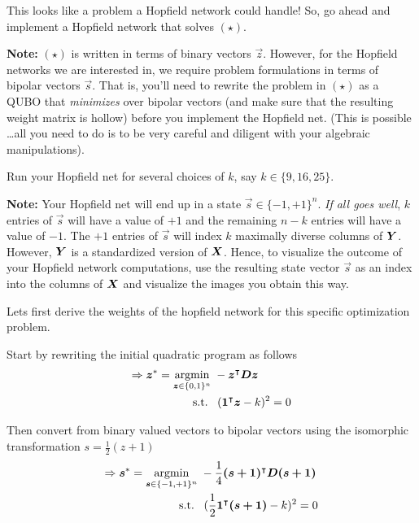 This looks like a problem a Hopfield network could handle! So, go ahead and implement a Hopfield network that solves $(\star)$.

\textbf{Note:} $(\star)$ is written in terms of binary vectors $\vec{z}$. However, for the Hopfield networks we are interested in, we require problem formulations in terms of bipolar vectors $\vec{s}$. That is, you'll need to rewrite the problem in $(\star)$ as a QUBO that \textit{minimizes} over bipolar vectors (and make sure that the resulting weight matrix is hollow) before you implement the Hopfield net. (This is possible \ldots all you need to do is to be very careful and diligent with your algebraic manipulations).

Run your Hopfield net for several choices of $k$, say $k \in \{9, 16, 25\}$.

\textbf{Note:} Your Hopfield net will end up in a state $\vec{s} \in \{ -1, +1 \}^n$. \emph{If all goes well}, $k$ entries of $\vec{s}$ will have a value of $+1$ and the remaining $n-k$ entries will have a value of $-1$. The $+1$ entries of $\vec{s}$ will index $k$ maximally diverse columns of $\bm{Y}$. However, $\bm{Y}$ is a standardized version of $\bm{X}$. Hence, to visualize the outcome of your Hopfield network computations, use the resulting state vector $\vec{s}$ as an index into the columns of $\bm{X}$ and visualize the images you obtain this way.

\color{blue}

Lets first derive the weights of the hopfield network for this specific optimization problem.

Start by rewriting the initial quadratic program as follows
\begin{align*}
\Rightarrow \bm{z}^* = \operatorname*{argmin}_{\bm{z} \in \{ 0, 1 \}^n} & \; -\bm{z}^\intercal \bm{D} \bm{z} \\
\operatorname{s.\!t.} \; & \; \; (\bm{1}^\intercal \bm{z} - k)^2 = 0
\end{align*}

Then convert from binary valued vectors to bipolar vectors using the isomorphic transformation $s = \frac12 (z+1)$
\begin{align*}
\Rightarrow \bm{s}^* = \operatorname*{argmin}_{\bm{s} \in \{ -1, +1 \}^n} & \; -\frac14 \bm{(s+1)}^\intercal \bm{D} \bm{(s+1)} \\
\operatorname{s.\!t.} \; & \; \; (\frac12 \bm{1}^\intercal \bm{(s+1)} - k)^2 = 0
\end{align*}

